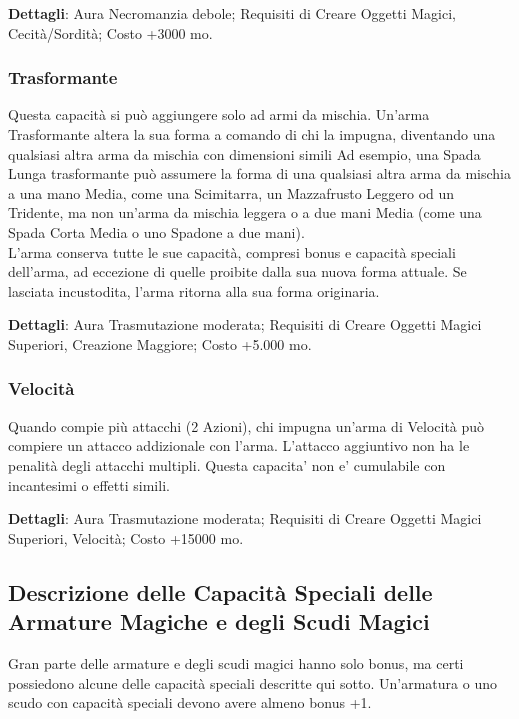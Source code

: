 \begin{multicols}{2}
\textbf{Dettagli}: Aura Necromanzia debole; Requisiti di Creare Oggetti Magici, Cecità/Sordità; Costo +3000 mo.

\subsubsection{Trasformante}

Questa capacità si può aggiungere solo ad armi da mischia. Un'arma Trasformante altera la sua forma a comando di chi la impugna, diventando una qualsiasi altra arma da mischia con dimensioni simili Ad esempio, una Spada Lunga trasformante può assumere la forma di una qualsiasi altra arma da mischia a una mano Media, come una Scimitarra, un Mazzafrusto Leggero od un Tridente, ma non un'arma da mischia leggera o a due mani Media (come una Spada Corta Media o uno Spadone a due mani).\\
L'arma conserva tutte le sue capacità, compresi bonus e capacità speciali dell'arma, ad eccezione di quelle proibite dalla sua nuova forma attuale. Se lasciata incustodita, l'arma ritorna alla sua forma originaria.

\textbf{Dettagli}: Aura Trasmutazione moderata; Requisiti di Creare Oggetti Magici Superiori, Creazione Maggiore; Costo +5.000 mo.

\subsubsection{Velocità}

Quando compie più attacchi (2 Azioni), chi impugna un'arma di Velocità può compiere un attacco addizionale con l'arma. L'attacco aggiuntivo non ha le penalità degli attacchi multipli. Questa capacita' non e' cumulabile con incantesimi o effetti simili.

\textbf{Dettagli}: Aura Trasmutazione moderata; Requisiti di Creare Oggetti Magici Superiori, Velocità; Costo +15000 mo.

\subsection{Descrizione delle Capacità Speciali delle Armature Magiche e degli Scudi Magici}

Gran parte delle armature e degli scudi magici hanno solo bonus, ma certi possiedono alcune delle capacità speciali descritte qui sotto. Un'armatura o uno scudo con capacità speciali devono avere almeno bonus +1.


\end{multicols}
